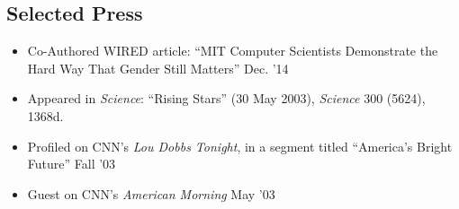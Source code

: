 \documentclass[margin]{res}
\begin{document}
\begin{resume}
%		 
 
\section{Selected Press}
\begin{itemize}[leftmargin=*] \itemsep -2pt
\item Co-Authored WIRED article: ``MIT Computer Scientists Demonstrate the Hard Way That Gender Still Matters'' \hfill Dec. '14
\item Appeared in \textit{Science}: ``Rising Stars'' (30 May 2003), \textit{Science} 300 (5624), 1368d.
\item Profiled on CNN's \textit{Lou Dobbs Tonight}, in a segment titled ``America's Bright Future''  \hfill Fall '03 
\item Guest on CNN's \textit{American Morning} \hfill May '03
\end{itemize}


\end{resume}
\end{document}
